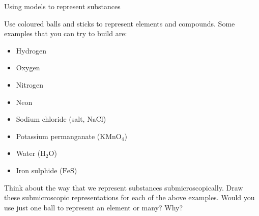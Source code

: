 \vspace{-1cm}
  \label{m38708*eip-326}
\begin{activity}{Using models to represent substances}{Use coloured balls and sticks to represent elements and compounds. Some examples that you can try to build are:
\label{m38708*eip-id1166921187210}
\begin{itemize}[noitemsep]
    \item Hydrogen
    \item Oxygen
    \item Nitrogen
    \item Neon
    \item Sodium chloride (salt, $\mathrm{NaCl}$)
    \item Potassium permanganate (${\mathrm{KMnO}}_{4}$)
    \item Water (${\mathrm{H}}_{2}\mathrm{O}$)
    \item Iron sulphide ($\mathrm{FeS}$)
\end{itemize}
Think about the way that we represent substances submicroscopically. Draw these submicroscopic representations for each of the above examples. Would you use just one ball to represent an element or many? Why? }
\end{activity}
\par \label{m38708*secfhsst!!!underscore!!!id212}
